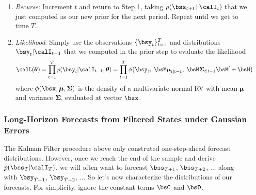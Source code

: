 \documentclass[12pt]{article}
\theoremstyle{plain}
\theoremstyle{definition}
\theoremstyle{remark}
\newcommand{\bstheta}{\boldsymbol{\theta}}
\newcommand{\bsmu}{\boldsymbol{\mu}}
\newcommand{\bsSigma}{\boldsymbol{\Sigma}}
\newcommand{\prodtT}{\prod^T_{t=1}}
\newcommand{\tT}{_{t=1}^T}
\begin{document}
\begin{enumerate}
  \item \emph{Recurse}:
    Increment $t$ and return to Step 1, taking
    $p(\bss_{t+1}|\;\calI_{t})$ that we just computed as our new prior
    for the next period. Repeat until we get to time $T$.

  \item \emph{Likelihood}:
    Simply use the observations $\{\bsy_t\}\tT$ and distributions
    $\bsy_t|\calI_{t-1}$ that we computed in the prior step to evaluate
    the likelihood
    \begin{align*}
      \calL(\bstheta)
      &= \prodtT p(\bsy_t|\calI_{t-1},\bstheta)
      = \prodtT
        \phi\big(
          \bsy_t, \;
          \bsM\bsmu_{t|t-1}, \;
          \bsM\bsSigma_{t|t-1}\bsM' + \bsH
        \big)
    \end{align*}
    where $\phi(\bsx,\bsmu,\bsSigma)$ is the density of a multivariate
    normal RV with mean $\bsmu$ and variance $\bsSigma$, evaluated at
    vector $\bsx$.
\end{enumerate}

\clearpage
\subsubsection{%
  Long-Horizon Forecasts from Filtered States under Gaussian Errors
}

The Kalman Filter procedure above only construted one-step-ahead
forecast distributions.
However, once we reach the end of the sample and derive
$p(\bss_T | \calI_{T})$, we will often want to forecast $\bss_{T+1}$,
$\bss_{T+2}$, $\ldots$ along with $\bsy_{T+1}$, $\bsy_{T+2}$, $\ldots$
So let's now characterize the distributions of our forecasts.
For simplicity, ignore the constant terms $\bsC$ and $\bsD$.
\end{document}
